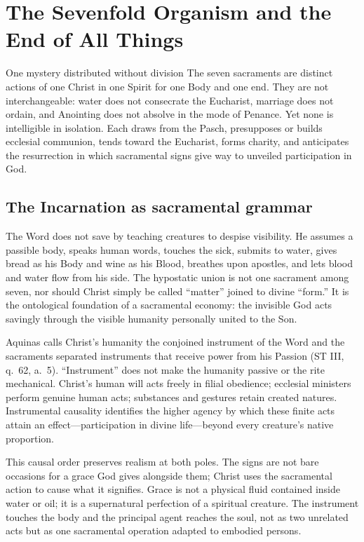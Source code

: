\section{The Sevenfold Organism and the End of All Things}

\begin{massbox}{One mystery distributed without division}
The seven sacraments are distinct actions of one Christ in one Spirit for one Body and one end. They are not interchangeable: water does not consecrate the Eucharist, marriage does not ordain, and Anointing does not absolve in the mode of Penance. Yet none is intelligible in isolation. Each draws from the Pasch, presupposes or builds ecclesial communion, tends toward the Eucharist, forms charity, and anticipates the resurrection in which sacramental signs give way to unveiled participation in God.
\end{massbox}

\subsection{The Incarnation as sacramental grammar}

The Word does not save by teaching creatures to despise visibility. He assumes a passible body, speaks human words, touches the sick, submits to water, gives bread as his Body and wine as his Blood, breathes upon apostles, and lets blood and water flow from his side. The hypostatic union is not one sacrament among seven, nor should Christ simply be called ``matter'' joined to divine ``form.'' It is the ontological foundation of a sacramental economy: the invisible God acts savingly through the visible humanity personally united to the Son.

Aquinas calls Christ's humanity the conjoined instrument of the Word and the sacraments separated instruments that receive power from his Passion (ST III, q.~62, a.~5). ``Instrument'' does not make the humanity passive or the rite mechanical. Christ's human will acts freely in filial obedience; ecclesial ministers perform genuine human acts; substances and gestures retain created natures. Instrumental causality identifies the higher agency by which these finite acts attain an effect---participation in divine life---beyond every creature's native proportion.

This causal order preserves realism at both poles. The signs are not bare occasions for a grace God gives alongside them; Christ uses the sacramental action to cause what it signifies. Grace is not a physical fluid contained inside water or oil; it is a supernatural perfection of a spiritual creature. The instrument touches the body and the principal agent reaches the soul, not as two unrelated acts but as one sacramental operation adapted to embodied persons.

